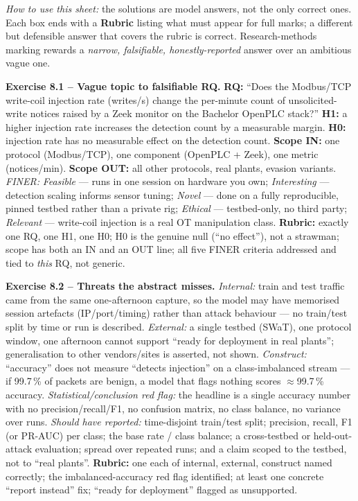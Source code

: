 \documentclass[11pt,a4paper]{article}
\begin{document}
\sheetheader

\noindent
\textit{How to use this sheet:} the solutions are model answers, not the only
correct ones. Each box ends with a \textbf{Rubric} listing what must appear for
full marks; a different but defensible answer that covers the rubric is correct.
Research-methods marking rewards a \emph{narrow, falsifiable, honestly-reported}
answer over an ambitious vague one.

\begin{solutionbox}
\textbf{Exercise 8.1 -- Vague topic to falsifiable RQ.}
\textbf{RQ:} ``Does the Modbus/TCP write-coil injection rate (writes/s) change the
per-minute count of unsolicited-write notices raised by a Zeek monitor on the
Bachelor OpenPLC stack?'' \textbf{H1:} a higher injection rate increases the
detection count by a measurable margin. \textbf{H0:} injection rate has no
measurable effect on the detection count. \textbf{Scope IN:} one protocol
(Modbus/TCP), one component (OpenPLC + Zeek), one metric (notices/min). \textbf{Scope OUT:}
all other protocols, real plants, evasion variants.
\textit{FINER:} \emph{Feasible} --- runs in one session on hardware you own;
\emph{Interesting} --- detection scaling informs sensor tuning; \emph{Novel} ---
done on a fully reproducible, pinned testbed rather than a private rig;
\emph{Ethical} --- testbed-only, no third party; \emph{Relevant} --- write-coil
injection is a real OT manipulation class.
\textbf{Rubric:} exactly one RQ, one H1, one H0; H0 is the genuine null (``no
effect''), not a strawman; scope has both an IN and an OUT line; all five FINER
criteria addressed and tied to \emph{this} RQ, not generic.
\end{solutionbox}

\begin{solutionbox}
\textbf{Exercise 8.2 -- Threats the abstract misses.}
\textit{Internal:} train and test traffic came from the same one-afternoon
capture, so the model may have memorised session artefacts (IP/port/timing) rather
than attack behaviour --- no train/test split by time or run is described.
\textit{External:} a single testbed (SWaT), one protocol window, one afternoon
cannot support ``ready for deployment in real plants''; generalisation to other
vendors/sites is asserted, not shown. \textit{Construct:} ``accuracy'' does not
measure ``detects injection'' on a class-imbalanced stream --- if 99.7\,\% of
packets are benign, a model that flags nothing scores $\approx$99.7\,\% accuracy.
\textit{Statistical/conclusion red flag:} the headline is a single accuracy number
with no precision/recall/F1, no confusion matrix, no class balance, no variance
over runs. \textit{Should have reported:} time-disjoint train/test split;
precision, recall, F1 (or PR-AUC) per class; the base rate / class balance; a
cross-testbed or held-out-attack evaluation; spread over repeated runs; and a
claim scoped to the testbed, not to ``real plants''.
\textbf{Rubric:} one each of internal, external, construct named correctly; the
imbalanced-accuracy red flag identified; at least one concrete ``report instead''
fix; ``ready for deployment'' flagged as unsupported.
\end{solutionbox}
\end{document}
